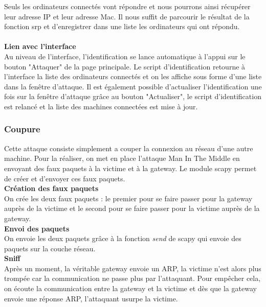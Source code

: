 \documentclass[11pt]{article}
\begin{document}
Seuls les ordinateurs connectés vont répondre et nous pourrons ainsi récupérer leur adresse IP et leur adresse Mac. Il nous suffit de parcourir le résultat de la fonction srp et d'enregistrer dans une liste les ordinateurs qui ont répondu.~\\
~\\

\textbf{Lien avec l'interface}~\\

Au niveau de l'interface, l'identification se lance automatique à l'appui sur le bouton "Attaquer" de la page principale. Le script d'identification retourne à l'interface la liste des ordinateurs connectés et on les affiche sous forme d'une liste dans la fenêtre d'attaque. Il est également possible d'actualiser l'identification une fois sur la fenêtre d'attaque grâce au bouton "Actualiser", le script d'identification est relancé et la liste des machines connectées est mise à jour.

\subsubsection{Coupure}
Cette attaque consiste simplement a couper la connexion au réseau d'une autre machine. Pour la réaliser, on met en place l'attaque Man In The Middle en envoyant des faux paquets à la victime et à la gateway. Le module scapy permet de créer et d'envoyer ces faux paquets.~\\

\textbf{Création des faux paquets}~\\

On crée les deux faux paquets : le premier pour se faire passer pour la gateway auprès de la victime et le second pour se faire passer pour la victime auprès de la gateway.~\\


\textbf{Envoi des paquets}~\\

On envoie les deux paquets grâce à la fonction \textit{send} de scapy qui envoie des paquets sur la couche réseau.~\\

\newpage
\textbf{Sniff}~\\

Après un moment, la véritable gateway envoie un ARP, la victime n'est alors plus trompée car la communication ne passe plus par l'attaquant. Pour empêcher cela, on écoute la communication entre la gateway et la victime et dès que la gateway envoie une réponse ARP, l'attaquant usurpe la victime.~\\

\end{document}
